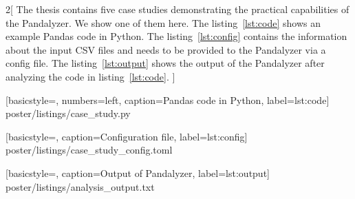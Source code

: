 
\setlength{\columnsep}{20cm}
\begin{multicols}{2}[
The thesis contains five case studies demonstrating the practical capabilities of the Pandalyzer.
We show one of them here. The listing~\ref{lst:code} shows an example Pandas code in Python.
The listing~\ref{lst:config} contains the information about the input CSV files and needs to be provided to the
Pandalyzer via a config file.
The listing~\ref{lst:output} shows the output of the Pandalyzer after analyzing the code in listing~\ref{lst:code}.
]


    [basicstyle=\normalsize\ttfamily, numbers=left, caption=Pandas code in Python, label={lst:code}]
    {poster/listings/case_study.py}


    [basicstyle=\normalsize\ttfamily, caption=Configuration file, label={lst:config}]
    {poster/listings/case_study_config.toml}

    [basicstyle=\normalsize\ttfamily, caption=Output of Pandalyzer, label={lst:output}]
    {poster/listings/analysis_output.txt}

\end{multicols}
